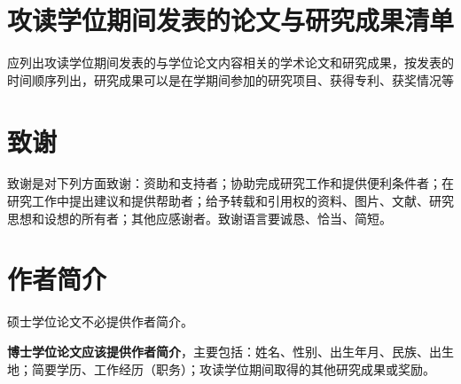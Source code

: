 \section{攻读学位期间发表的论文与研究成果清单}
应列出攻读学位期间发表的与学位论文内容相关的学术论文和研究成果，按发表的时间顺序列出，研究成果可以是在学期间参加的研究项目、获得专利、获奖情况等

\section{致谢}
致谢是对下列方面致谢：资助和支持者；协助完成研究工作和提供便利条件者；在研究工作中提出建议和提供帮助者；给予转载和引用权的资料、图片、文献、研究思想和设想的所有者；其他应感谢者。致谢语言要诚恳、恰当、简短。

\section{作者简介}
硕士学位论文不必提供作者简介。

\textbf{博士学位论文应该提供作者简介}，主要包括：姓名、性别、出生年月、民族、出生地；简要学历、工作经历（职务）；攻读学位期间取得的其他研究成果或奖励。


